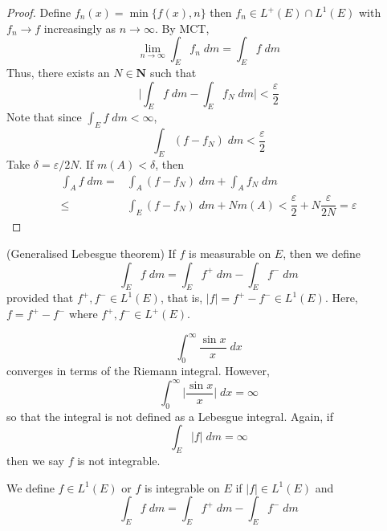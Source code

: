 \vspace{2ex}
\begin{proof}
Define $f_{n}(x)=\min\{f(x), n\}$ then $f_{n}\in L^{+}(E)\cap L^{1}(E)$ with $f_{n}\rightarrow f$ increasingly as $n\rightarrow \infty $. By MCT,
\[\lim _{n\rightarrow \infty }\int _{E}f_{n}\;d m=\int _{E}f\;d m\]
Thus, there exists an $N\in {\bm N}$ such that
\[\Big|\int _{E}f\;d m-\int _{E}f_{N}\;d m\Big|<\dfrac{\varepsilon }{2}\]
Note that since $\int _{E}f\;d m<\infty $,
\[\int _{E}(f-f_{N})\;dm<\dfrac{\varepsilon }{2}\]
Take $\delta =\varepsilon /2N$. If $m(A)<\delta $, then
\begin{align*}
\int _{A}f\;d m=&\int _{A}(f-f_{N})\;d m+\int _{A}f_{N}\;d m\\
\leq&\int _{E}(f-f_{N})\;d m+Nm(A)<\dfrac{\varepsilon }{2}+N\dfrac{\varepsilon }{2N}=\varepsilon 
\end{align*}
\end{proof}
\vspace{2ex}
\begin{thm}
(Generalised Lebesgue theorem) If $f$ is measurable on $E$, then we define 
\[\int _{E}f\;d m=\int _{E}f^{+}\;d m-\int _{E}f^{-}\;d m\]
provided that $f^{+},f^{-}\in L^{1}(E)$, that is, $|f|=f^{+}-f^{-}\in L^{1}(E)$. Here, $f=f^{+}-f^{-}$ where $f^{+},f^{-}\in L^{+}(E)$. 
\end{thm}
\vspace{2ex}
\begin{ex}
\[\int ^{\infty }_{0}\dfrac{\sin x}{x}\;dx\]
converges in terms of the Riemann integral. However,
\[\int ^{\infty }_{0}\Big|\dfrac{\sin x}{x}\Big|\;dx=\infty \]
so that the integral is not defined as a Lebesgue integral. Again, if 
\[\int _{E}|f|\;d m=\infty \]
then we say $f$ is not integrable. 
\end{ex}
\vspace{2ex}
\begin{defi}
We define $f\in L^{1}(E)$ or $f$ is integrable on $E$ if $|f|\in L^{1}(E)$ and 
\[\int _{E}f\;d m=\int _{E}f^{+}\;d m-\int _{E}f^{-}\;d m\]
\end{defi}
\vspace{2ex}
 
